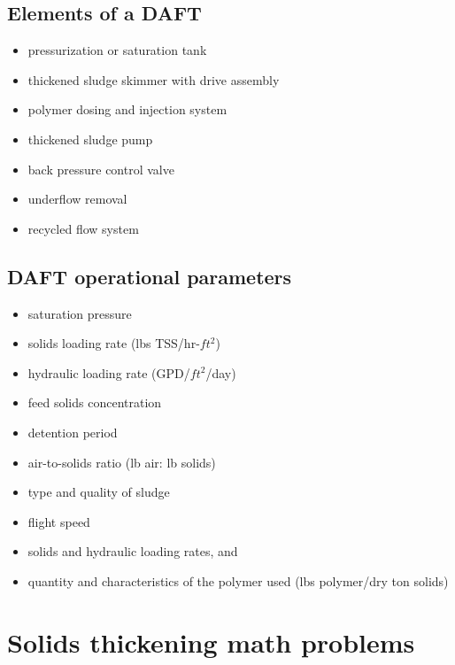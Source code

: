 \subsection{Elements of a DAFT}

\begin{itemize}
\item pressurization or saturation tank 
\item thickened sludge skimmer with drive assembly
\item polymer dosing and injection system
\item thickened sludge pump
\item back pressure control valve
\item underflow removal
\item recycled flow system
\end{itemize}

\subsection{DAFT operational parameters}

\begin{itemize}
\item saturation pressure
\item solids loading rate (lbs TSS/hr-$ft^2$)
\item hydraulic loading rate (GPD/$ft^2$/day)
\item feed solids concentration
\item detention period
\item air-to-solids ratio (lb air: lb solids)
\item type and quality of sludge
\item flight speed
\item solids and hydraulic loading rates, and
\item quantity and characteristics of the polymer used (lbs polymer/dry ton solids)
\end{itemize}



\section{Solids thickening math problems}

